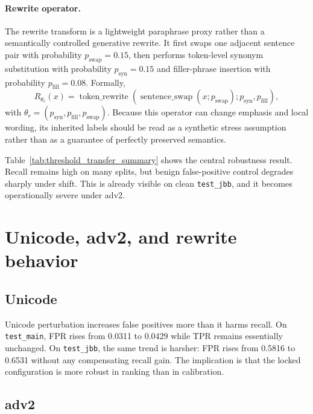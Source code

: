 \paragraph{Rewrite operator.}
The rewrite transform is a lightweight paraphrase proxy rather than a semantically controlled generative rewrite. It first swaps one adjacent sentence pair with probability $p_{\mathrm{swap}} = 0.15$, then performs token-level synonym substitution with probability $p_{\mathrm{syn}} = 0.15$ and filler-phrase insertion with probability $p_{\mathrm{fill}} = 0.08$. Formally,
\begin{equation}
  R_{\theta_r}(x) = \operatorname{token\_rewrite}(\operatorname{sentence\_swap}(x; p_{\mathrm{swap}}); p_{\mathrm{syn}}, p_{\mathrm{fill}}),
\end{equation}
with $\theta_r = (p_{\mathrm{syn}}, p_{\mathrm{fill}}, p_{\mathrm{swap}})$. Because this operator can change emphasis and local wording, its inherited labels should be read as a synthetic stress assumption rather than as a guarantee of perfectly preserved semantics.



Table~\ref{tab:threshold_transfer_summary} shows the central robustness result. Recall remains high on many splits, but benign false-positive control degrades sharply under shift. This is already visible on clean \texttt{test\_jbb}, and it becomes operationally severe under adv2.

\section{Unicode, adv2, and rewrite behavior}

\subsection{Unicode}

Unicode perturbation increases false positives more than it harms recall. On \texttt{test\_main}, FPR rises from 0.0311 to 0.0429 while TPR remains essentially unchanged. On \texttt{test\_jbb}, the same trend is harsher: FPR rises from 0.5816 to 0.6531 without any compensating recall gain. The implication is that the locked configuration is more robust in ranking than in calibration.

\subsection{adv2}


